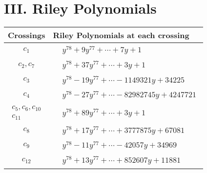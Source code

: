 \documentclass[1p]{elsarticle_modified}
\theoremstyle{definition}
\begin{document}
\centering \section*{ III. Riley Polynomials}
\begin{tabular}{m{50pt}|m{274pt}}
Crossings & \hspace{64pt}Riley Polynomials at each crossing \\
\hline $$\begin{aligned}c_{1}\end{aligned}$$&$\begin{aligned}
&y^{78}+9 y^{77}+\cdots+7 y+1
\end{aligned}$\\
\hline $$\begin{aligned}c_{2},c_{7}\end{aligned}$$&$\begin{aligned}
&y^{78}+37 y^{77}+\cdots+3 y+1
\end{aligned}$\\
\hline $$\begin{aligned}c_{3}\end{aligned}$$&$\begin{aligned}
&y^{78}-19 y^{77}+\cdots-1149321 y+34225
\end{aligned}$\\
\hline $$\begin{aligned}c_{4}\end{aligned}$$&$\begin{aligned}
&y^{78}-27 y^{77}+\cdots-82982745 y+4247721
\end{aligned}$\\
\hline $$\begin{aligned}c_{5},c_{6},c_{10}\\c_{11}\end{aligned}$$&$\begin{aligned}
&y^{78}+89 y^{77}+\cdots+3 y+1
\end{aligned}$\\
\hline $$\begin{aligned}c_{8}\end{aligned}$$&$\begin{aligned}
&y^{78}+17 y^{77}+\cdots+3777875 y+67081
\end{aligned}$\\
\hline $$\begin{aligned}c_{9}\end{aligned}$$&$\begin{aligned}
&y^{78}-11 y^{77}+\cdots-42057 y+34969
\end{aligned}$\\
\hline $$\begin{aligned}c_{12}\end{aligned}$$&$\begin{aligned}
&y^{78}+13 y^{77}+\cdots+852607 y+11881
\end{aligned}$\\
\hline
\end{tabular}
\vskip 2pc
\end{document}
